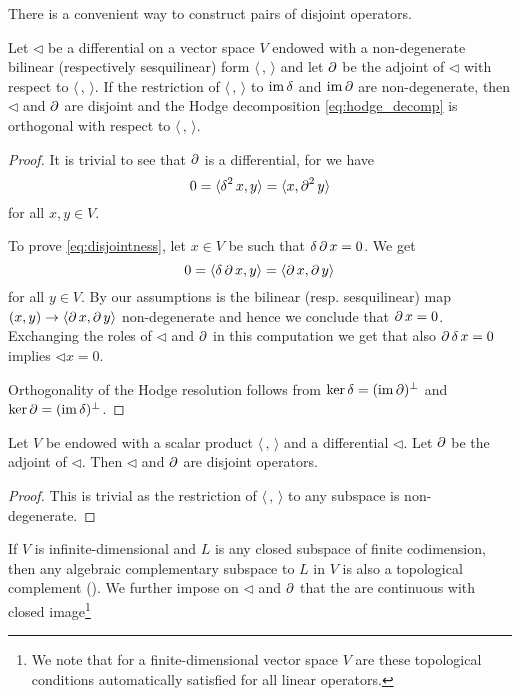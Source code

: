 There is a convenient way to construct pairs of disjoint operators.
\begin{proposition} %
 Let $\lhd$ be a differential on a vector space $V$ endowed with a non-degenerate bilinear (respectively sesquilinear) form $\langle \, , \, \rangle$ and let $\operatorname{\partial}$ be the adjoint of $\lhd$ with respect to $\langle \, , \, \rangle$. If the restriction of $\langle \, , \, \rangle$ to $\operatorname{\mathrm{im}} \operatorname{\delta}$ and $\operatorname{\mathrm{im}} \operatorname{\partial}$ are non-degenerate, then $\lhd$ and $\operatorname{\partial}$ are disjoint and the Hodge decomposition \eqref{eq:hodge_decomp} is orthogonal with respect to $\langle \, , \, \rangle$.
\end{proposition}
\begin{proof}
 It is trivial to see that $\operatorname{\partial}$ is a differential, for we have 
 \[ 0 = \langle \operatorname{\delta} ^2 x, y \rangle = \langle x, \operatorname{\partial}^2 y \rangle\]
 for all $x,y\in V$.

 To prove \eqref{eq:disjointness}, let $x\in V$ be such that $\operatorname{\delta} \operatorname{\partial} x = 0$. We get
 \[ 0 = \langle \operatorname{\delta}\operatorname{\partial} x , y \rangle = \langle \operatorname{\partial} x, \operatorname{\partial} y \rangle \]
 for all $y\in V$. By our assumptions is the bilinear (resp. sesquilinear) map $(x,y) \to \langle \operatorname{\partial} x, \operatorname{\partial} y \rangle$ non-degenerate and hence we conclude that $\operatorname{\partial} x = 0$. Exchanging the roles of $\lhd$ and $\operatorname{\partial}$ in this computation we get that also $\operatorname{\partial} \operatorname{\delta} x =0$ implies $\lhd x=0$.

 Orthogonality of the Hodge resolution follows from $\ker \operatorname{\delta} = (\operatorname{\mathrm{im}}\operatorname{\partial})^\perp$ and $\ker \operatorname{\partial} = (\operatorname{\mathrm{im}} \operatorname{\delta})^\perp$.
\end{proof}
\begin{corollary}
 Let $V$ be endowed with a scalar product $\langle \, , \, \rangle$ and a differential $\lhd$. Let $\operatorname{\partial}$ be the adjoint of $\lhd$. Then $\lhd$ and $\operatorname{\partial}$ are disjoint operators. 
\end{corollary}
\begin{proof}
 This is trivial as the restriction of $\langle \, , \, \rangle$ to any subspace is non-degenerate.
\end{proof}

 If $V$ is infinite-dimensional and $L$ is any closed subspace of finite codimension, then any algebraic complementary subspace to $L$ in $V$ is also a topological complement (\cite{schaefer_topological_1999}). We further impose on $\lhd$ and $\operatorname{\partial}$ that the are continuous with closed image\footnote{We note that for a finite-dimensional vector space $V$ are these topological conditions automatically satisfied for all linear operators.}

